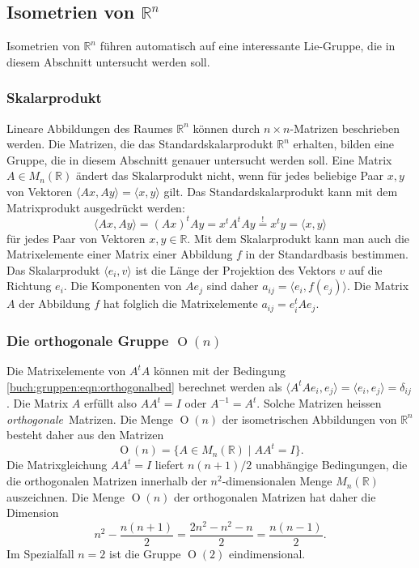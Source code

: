 %
%
\subsection{Isometrien von $\mathbb{R}^n$
\label{buch:gruppen:isometrien}}
Isometrien von $\mathbb{R}^n$ führen automatisch auf eine interessante
Lie-Gruppe, die in diesem Abschnitt untersucht werden soll.

\subsubsection{Skalarprodukt}
Lineare Abbildungen des Raumes $\mathbb{R}^n$ können durch
$n\times n$-Matrizen beschrieben werden.
Die Matrizen, die das Standardskalarprodukt $\mathbb{R}^n$ erhalten,
bilden eine Gruppe, die in diesem Abschnitt genauer untersucht werden soll.
Eine Matrix $A\in M_{n}(\mathbb{R})$ ändert das Skalarprodukt nicht, wenn
für jedes beliebige Paar $x,y$ von Vektoren 
$\langle Ax,Ay\rangle = \langle x,y\rangle$ gilt.
Das Standardskalarprodukt kann mit dem Matrixprodukt ausgedrückt werden:
\begin{equation}
\langle Ax,Ay\rangle
=
(Ax)^tAy
=
x^tA^tAy
\overset{!}{=}
x^ty
=
\langle x,y\rangle
\label{buch:gruppen:eqn:orthogonalbed}
\end{equation}
für jedes Paar von Vektoren $x,y\in\mathbb{R}$.
%
Mit dem Skalarprodukt kann man auch die Matrixelemente einer Matrix
einer Abbildung $f$ in der Standardbasis bestimmen.
Das Skalarprodukt $\langle e_i, v\rangle$ ist die Länge der Projektion
des Vektors $v$ auf die Richtung $e_i$.
Die Komponenten von $Ae_j$ sind daher $a_{i\!j}=\langle e_i,f(e_j)\rangle$.
Die Matrix $A$ der Abbildung $f$ hat folglich die Matrixelemente
$a_{i\!j}=e_i^tAe_j$.

\subsubsection{Die orthogonale Gruppe $\operatorname{O}(n)$}
Die Matrixelemente von $A^tA$ können
mit der Bedingung \eqref{buch:gruppen:eqn:orthogonalbed}
berechnet werden als
$\langle A^tAe_i, e_j\rangle =\langle e_i,e_j\rangle = \delta_{i\!j}$.
Die Matrix $A$ erfüllt also $AA^t=I$ oder $A^{-1}=A^t$.
Solche Matrizen heissen {\em orthogonale} Matrizen.
%
Die Menge $\operatorname{O}(n)$ der isometrischen Abbildungen
%
von $\mathbb{R}^n$ besteht
daher aus den Matrizen
\[
\operatorname{O}(n)
=
\{ A\in M_n(\mathbb{R}) \mid AA^t=I\}.
\]
Die Matrixgleichung $AA^t=I$ liefert $n(n+1)/2$ unabhängige Bedingungen,
die die orthogonalen Matrizen innerhalb der $n^2$-dimensionalen
Menge $M_n(\mathbb{R})$ auszeichnen.
Die Menge $\operatorname{O}(n)$ der orthogonalen Matrizen hat daher
die Dimension
\[
n^2 - \frac{n(n+1)}{2}
=
\frac{2n^2-n^2-n}{2}
=
\frac{n(n-1)}2.
\]
Im Spezialfall $n=2$ ist die Gruppe $\operatorname{O}(2)$ eindimensional.

